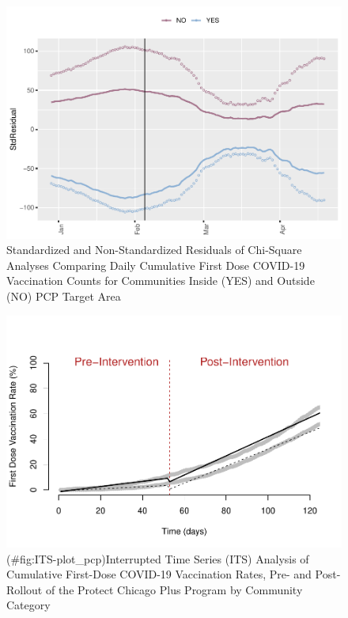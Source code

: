 \documentclass[
]{article}
\begin{document}
\begin{figure}
\centering
\includegraphics{VaccineEquityInChicago_20210410_files/figure-latex/chi-square-analysis-1.pdf}
\caption{\label{fig:chi-square-analysis}Standardized and Non-Standardized Residuals of Chi-Square Analyses Comparing Daily Cumulative First Dose COVID-19 Vaccination Counts for Communities Inside (YES) and Outside (NO) PCP Target Area}
\end{figure}

\begin{figure}
\centering
\includegraphics{VaccineEquityInChicago_20210410_files/figure-latex/ITS-plot_pcp-1.pdf}
\caption{(\#fig:ITS-plot\_pcp)Interrupted Time Series (ITS) Analysis of Cumulative First-Dose COVID-19 Vaccination Rates, Pre- and Post-Rollout of the Protect Chicago Plus Program by Community Category}
\end{figure}
\end{document}
